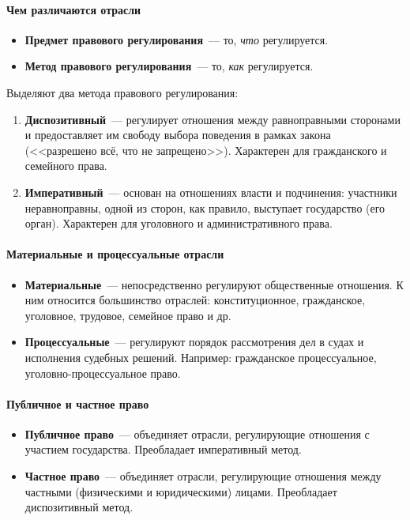 \documentclass[12pt]{article}
\begin{document}
	\paragraph{Чем различаются отрасли}
	
	\begin{itemize}
		\item \textbf{Предмет правового регулирования}~--- то, \emph{что} регулируется.
		\item \textbf{Метод правового регулирования}~--- то, \emph{как} регулируется.
	\end{itemize}
	
	Выделяют два метода правового регулирования:
	\begin{enumerate}
		\item \textbf{Диспозитивный}~--- регулирует отношения между равноправными сторонами и предоставляет им свободу выбора поведения в рамках закона (<<разрешено всё, что не запрещено>>). Характерен для гражданского и семейного права.
		\item \textbf{Императивный}~--- основан на отношениях власти и подчинения: участники неравноправны, одной из сторон, как правило, выступает государство (его орган). Характерен для уголовного и административного права.
	\end{enumerate}
	
	\paragraph{Материальные и процессуальные отрасли}
	
	\begin{itemize}
		\item \textbf{Материальные}~--- непосредственно регулируют общественные отношения. К ним относится большинство отраслей: конституционное, гражданское, уголовное, трудовое, семейное право и др.
		\item \textbf{Процессуальные}~--- регулируют порядок рассмотрения дел в судах и исполнения судебных решений. Например: гражданское процессуальное, уголовно-процессуальное право.
	\end{itemize}
	
	\paragraph{Публичное и частное право}
	
	\begin{itemize}
		\item \textbf{Публичное право}~--- объединяет отрасли, регулирующие отношения с участием государства. Преобладает императивный метод.
		\item \textbf{Частное право}~--- объединяет отрасли, регулирующие отношения между частными (физическими и юридическими) лицами. Преобладает диспозитивный метод.
	\end{itemize}
\end{document}
